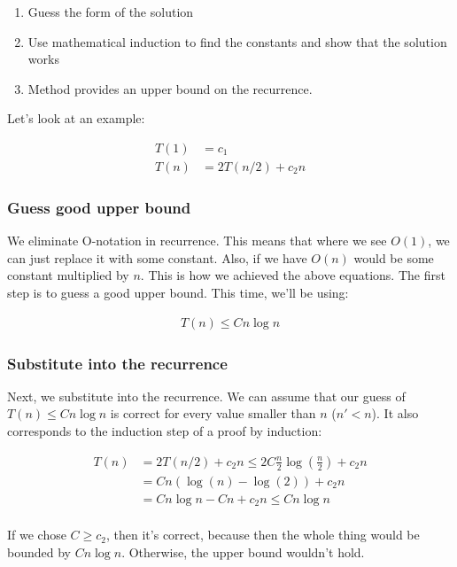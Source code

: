 \documentclass[11pt,a4paper,titlepage,dvipsnames,cmyk]{scrartcl}
\begin{document}
\begin{enumerate}
    \item Guess the form of the solution
    \item Use mathematical induction to find the constants and show that
        the solution works
    \item Method provides an upper bound on the recurrence.
\end{enumerate}

Let's look at an example:

\begin{align*}
    T(1) &= c_1 \\
    T(n) &= 2T(n/2) + c_2n
\end{align*}

\subsubsection{Guess good upper bound}%
\label{ssub:Guess good upper bound}

We eliminate O-notation in recurrence. This means that where we see
$O(1)$, we can just replace it with some constant. Also, if we have $O(n)$
would be some constant multiplied by $n$. This is how we achieved the
above equations. The first step is to guess a good upper bound. This time,
we'll be using:

\begin{align*}
    T(n) \le Cn \log n
\end{align*}

\subsubsection{Substitute into the recurrence}%
\label{ssub:Substitute into the recurrence}

Next, we substitute into the recurrence. We can assume that our guess of
$T(n) \le Cn \log n$ is correct for every value smaller than $n$ ($n' <
n$). It also corresponds to the induction step of a proof by induction:

\begin{align*}
    T(n) &= 2T(n/2) + c_2n \le 2C\frac{n}{2}\log(\frac{n}{2}) + c_2 n \\
         &= Cn(\log(n) - \log(2)) + c_2n \\
         &= Cn \log n - Cn + c_2 n \le Cn \log n \\
\end{align*}

If we chose $C \ge c_2$, then it's correct, because then the whole thing
would be bounded by $Cn \log n$. Otherwise, the upper bound wouldn't hold. 
\end{document}
